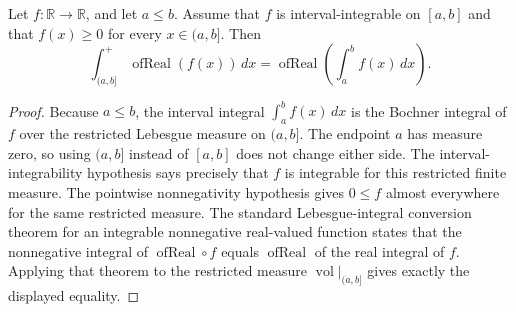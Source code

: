 \begin{helper}
Let \(f:\mathbb R\to\mathbb R\), and let \(a\le b\).  Assume that \(f\) is
interval-integrable on \([a,b]\) and that \(f(x)\ge0\) for every
\(x\in(a,b]\).  Then
\[
\int_{(a,b]}^{+}\operatorname{ofReal}(f(x))\,dx
=
\operatorname{ofReal}\left(\int_a^b f(x)\,dx\right).
\]
\end{helper}
\begin{proof}
Because \(a\le b\), the interval integral \(\int_a^b f(x)\,dx\) is the
Bochner integral of \(f\) over the restricted Lebesgue measure on
\((a,b]\).  The endpoint \(a\) has measure zero, so using \((a,b]\) instead
of \([a,b]\) does not change either side.  The interval-integrability
hypothesis says precisely that \(f\) is integrable for this restricted finite
measure.  The pointwise nonnegativity hypothesis gives \(0\le f\) almost
everywhere for the same restricted measure.  The standard
Lebesgue-integral conversion theorem for an integrable nonnegative real-valued
function states that the nonnegative integral of
\(\operatorname{ofReal}\circ f\) equals \(\operatorname{ofReal}\) of the real
integral of \(f\).  Applying that theorem to the restricted measure
\(\operatorname{vol}|_{(a,b]}\) gives exactly the displayed equality.
\end{proof}
